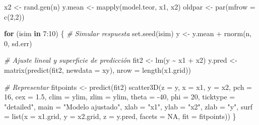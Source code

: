 \documentclass[
  spanish,
]{book}
\newenvironment{Shaded}{\begin{snugshade}}{\end{snugshade}}
\newcommand{\AttributeTok}[1]{\textcolor[rgb]{0.77,0.63,0.00}{#1}}
\newcommand{\CommentTok}[1]{\textcolor[rgb]{0.56,0.35,0.01}{\textit{#1}}}
\newcommand{\ConstantTok}[1]{\textcolor[rgb]{0.00,0.00,0.00}{#1}}
\newcommand{\ControlFlowTok}[1]{\textcolor[rgb]{0.13,0.29,0.53}{\textbf{#1}}}
\newcommand{\DecValTok}[1]{\textcolor[rgb]{0.00,0.00,0.81}{#1}}
\newcommand{\FloatTok}[1]{\textcolor[rgb]{0.00,0.00,0.81}{#1}}
\newcommand{\FunctionTok}[1]{\textcolor[rgb]{0.00,0.00,0.00}{#1}}
\newcommand{\NormalTok}[1]{#1}
\newcommand{\OtherTok}[1]{\textcolor[rgb]{0.56,0.35,0.01}{#1}}
\newcommand{\SpecialCharTok}[1]{\textcolor[rgb]{0.00,0.00,0.00}{#1}}
\newcommand{\StringTok}[1]{\textcolor[rgb]{0.31,0.60,0.02}{#1}}
\theoremstyle{break}
\theoremstyle{definition}
\theoremstyle{definition}
\theoremstyle{definition}
\theoremstyle{definition}
\theoremstyle{remark}
\begin{document}
\begin{Shaded}
\begin{Highlighting}[]
\NormalTok{x2 }\OtherTok{\textless{}{-}} \FunctionTok{rand.gen}\NormalTok{(n)}
\NormalTok{y.mean }\OtherTok{\textless{}{-}} \FunctionTok{mapply}\NormalTok{(model.teor, x1, x2)}
\NormalTok{oldpar }\OtherTok{\textless{}{-}} \FunctionTok{par}\NormalTok{(}\AttributeTok{mfrow =} \FunctionTok{c}\NormalTok{(}\DecValTok{2}\NormalTok{,}\DecValTok{2}\NormalTok{))}

\ControlFlowTok{for}\NormalTok{ (isim }\ControlFlowTok{in} \DecValTok{7}\SpecialCharTok{:}\DecValTok{10}\NormalTok{) \{}
  \CommentTok{\# Simular respuesta}
  \FunctionTok{set.seed}\NormalTok{(isim)}
\NormalTok{  y }\OtherTok{\textless{}{-}}\NormalTok{ y.mean }\SpecialCharTok{+} \FunctionTok{rnorm}\NormalTok{(n, }\DecValTok{0}\NormalTok{, sd.err)}
  
  \CommentTok{\# Ajuste lineal y superficie de predicción}
\NormalTok{  fit2 }\OtherTok{\textless{}{-}} \FunctionTok{lm}\NormalTok{(y }\SpecialCharTok{\textasciitilde{}}\NormalTok{ x1 }\SpecialCharTok{+}\NormalTok{ x2)}
\NormalTok{  y.pred }\OtherTok{\textless{}{-}} \FunctionTok{matrix}\NormalTok{(}\FunctionTok{predict}\NormalTok{(fit2, }\AttributeTok{newdata =}\NormalTok{ xy), }\AttributeTok{nrow =} \FunctionTok{length}\NormalTok{(x1.grid)) }
  
  \CommentTok{\# Representar}
\NormalTok{  fitpoints }\OtherTok{\textless{}{-}} \FunctionTok{predict}\NormalTok{(fit2) }
  \FunctionTok{scatter3D}\NormalTok{(}\AttributeTok{z =}\NormalTok{ y, }\AttributeTok{x =}\NormalTok{ x1, }\AttributeTok{y =}\NormalTok{ x2, }\AttributeTok{pch =} \DecValTok{16}\NormalTok{, }\AttributeTok{cex =} \FloatTok{1.5}\NormalTok{, }\AttributeTok{clim =}\NormalTok{ ylim, }\AttributeTok{zlim =}\NormalTok{ ylim,}
            \AttributeTok{theta =} \SpecialCharTok{{-}}\DecValTok{40}\NormalTok{, }\AttributeTok{phi =} \DecValTok{20}\NormalTok{, }\AttributeTok{ticktype =} \StringTok{"detailed"}\NormalTok{, }
            \AttributeTok{main =} \StringTok{"Modelo ajustado"}\NormalTok{, }\AttributeTok{xlab =} \StringTok{"x1"}\NormalTok{, }\AttributeTok{ylab =} \StringTok{"x2"}\NormalTok{, }\AttributeTok{zlab =} \StringTok{"y"}\NormalTok{, }
            \AttributeTok{surf =} \FunctionTok{list}\NormalTok{(}\AttributeTok{x =}\NormalTok{ x1.grid, }\AttributeTok{y =}\NormalTok{ x2.grid, }\AttributeTok{z =}\NormalTok{ y.pred, }
                        \AttributeTok{facets =} \ConstantTok{NA}\NormalTok{, }\AttributeTok{fit =}\NormalTok{ fitpoints))}
\NormalTok{\}}
\end{Highlighting}
\end{Shaded}
\end{document}
